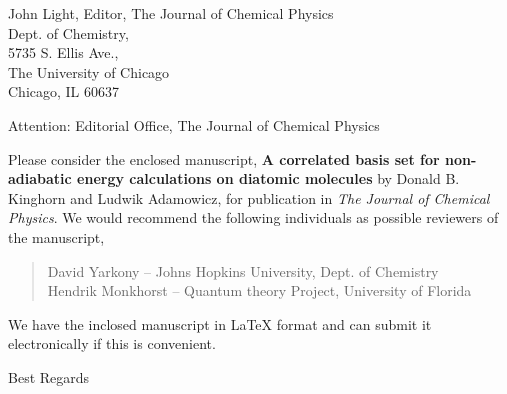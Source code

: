 \documentclass{letter}
\begin{document}
\begin{letter}{John Light, Editor, The Journal of Chemical Physics\\
               Dept. of Chemistry,\\
               5735 S. Ellis Ave.,\\
               The University of Chicago\\
               Chicago, IL 60637}      

\opening{Attention: Editorial Office, The Journal of Chemical Physics}
Please consider the enclosed manuscript, \textbf{A correlated basis set for
non-adiabatic energy calculations on diatomic molecules }
by Donald B. Kinghorn and Ludwik Adamowicz, for publication in \emph{The
Journal of Chemical Physics}.
We would recommend the following individuals as possible reviewers of the manuscript,
\begin{quote}
  David Yarkony -- Johns Hopkins University, Dept. of Chemistry\\
  Hendrik Monkhorst -- Quantum theory Project, University of Florida
\end{quote}

We have the inclosed manuscript in LaTeX format and can submit it electronically if this is convenient.


\closing{Best Regards}

\end{letter}
\end{document}
